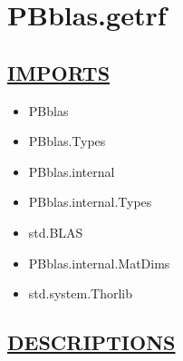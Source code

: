 \chapter*{PBblas.getrf}
\hypertarget{PBblas.getrf}{}

\section*{\underline{IMPORTS}}
\begin{itemize}
\item PBblas
\item PBblas.Types
\item PBblas.internal
\item PBblas.internal.Types
\item std.BLAS
\item PBblas.internal.MatDims
\item std.system.Thorlib
\end{itemize}

\section*{\underline{DESCRIPTIONS}}
